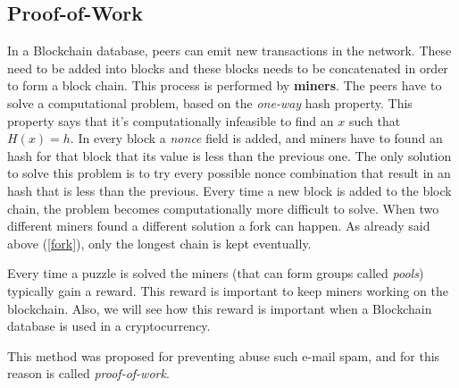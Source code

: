 \subsection{Proof-of-Work}

In a Blockchain database, peers can emit new transactions in the network. These
need to be added into blocks and these blocks needs to be concatenated in order
to form a block chain. This process is performed by \textbf{miners}.
The peers have to solve a computational problem, based on the \textit{one-way}
hash property. This property says that it's computationally infeasible to find
an $x$ such that $H(x) = h$.
In every block a \textit{nonce} field is added, and miners have to found an
hash for that block that its value is less than the previous one\cite{sok15}.
The only solution to solve this problem is to try every possible nonce
combination that result in an hash that is less than the previous. Every time a
new block is added to the block chain, the problem becomes computationally more
difficult to solve.
When two different miners found a different solution a fork can happen. As
already said above (\ref{fork}), only the longest chain is kept eventually.

Every time a puzzle is solved the miners (that can form groups called
\textit{pools}) typically gain a reward. This reward is important to keep miners
working on the blockchain. Also, we will see how this reward is important when
a Blockchain database is used in a cryptocurrency.

This method was proposed for preventing abuse such e-mail spam, and for this
reason is called \textit{proof-of-work}\cite{back02}.
